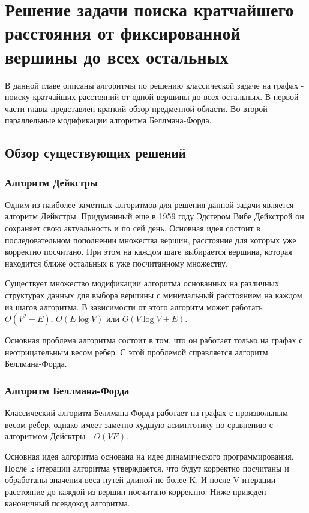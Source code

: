 \chapter{Решение задачи поиска кратчайшего расстояния от фиксированной вершины до всех остальных}
\label{chapSVD}

В данной главе описаны алгоритмы по решению классической задаче на графах - поиску кратчайших расстояний от одной вершины до всех остальных. В первой части главы представлен краткий обзор предметной области. Во второй параллельные модификации алгоритма Беллмана-Форда. 

\FloatBarrier
\section{Обзор существующих решений}
\subsection{Алгоритм Дейкстры}

Одним из наиболее заметных алгоритмов для решения данной задачи является алгоритм Дейкстры. Придуманный еще в 1959 году Эдсгером Вибе Дейкстрой он сохраняет свою актуальность и по сей день. Основная идея состоит в последовательном пополнении множества вершин, расстояние для которых уже корректно посчитано. При этом на каждом шаге выбирается вершина, которая находится ближе остальных к уже посчитанному множеству. 

Существует множество модификации алгоритма основанных на различных структурах данных для выбора вершины с минимальный расстоянием на каждом из шагов алгоритма. В зависимости от этого алгоритм может работать $O(V^2+E)$, $O(E \log V)$ или $O(V \log V+E)$. 

Основная проблема алгоритма состоит в том, что он работает только на графах с неотрицательным весом ребер. С этой проблемой справляется алгоритм Беллмана-Форда. 


\FloatBarrier
\subsection{Алгоритм Беллмана-Форда}

Классический алгоритм Беллмана-Форда работает на графах с произвольным весом ребер, однако имеет заметно худшую асимптотику по сравнению с алгоритмом Дейсктры - $O(VE)$. 

Основная идея алгоритма основана на идее динамического программирования. После k итерации алгоритма утверждается, что будут корректно посчитаны и обработаны значения веса путей длиной не более K. И после V итерации расстояние до каждой из вершин посчитано корректно. Ниже приведен каноничный псевдокод алгоритма. 

